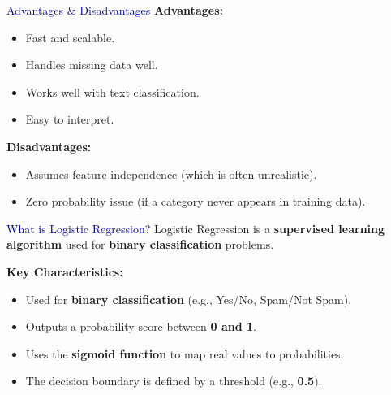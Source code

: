 \begin{frame}{\textcolor{darkblue}{Advantages & Disadvantages}}
    \textbf{Advantages:}
    \begin{itemize}
        \item Fast and scalable.
        \item Handles missing data well.
        \item Works well with text classification.
        \item Easy to interpret.
    \end{itemize}

    \textbf{Disadvantages:}
    \begin{itemize}
        \item Assumes feature independence (which is often unrealistic).
        \item Zero probability issue (if a category never appears in training data).
    \end{itemize}
\end{frame}

\begin{frame}{\textcolor{darkblue}{What is Logistic Regression?}}
    Logistic Regression is a \textbf{supervised learning algorithm} used for \textbf{binary classification} problems.
    
    \textbf{Key Characteristics:}
    \begin{itemize}
        \item Used for \textbf{binary classification} (e.g., Yes/No, Spam/Not Spam).
        \item Outputs a probability score between \textbf{0 and 1}.
        \item Uses the \textbf{sigmoid function} to map real values to probabilities.
        \item The decision boundary is defined by a threshold (e.g., \textbf{0.5}).
    \end{itemize}
\end{frame}


